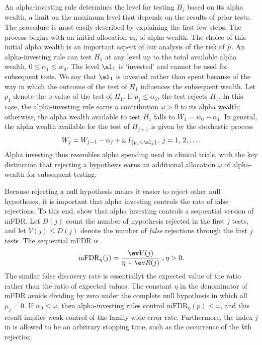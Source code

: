 \documentclass[12pt]{article}
\begin{document}
 An alpha-investing rule \citep{fosterstine08} determines the level for testing
 $H_j$ based on its alpha wealth, a limit on the maximum level that depends on
 the results of prior tests.  The procedure is most easily described by
 explaining the first few steps.  The process begins with an initial allocation
 $w_0$  of alpha wealth.  The choice of this initial alpha
 wealth is an important aspect of our analysis of the risk of $\hat\mu$.  An
 alpha-investing rule can test $H_1$ at any level up to the total available
 alpha wealth, $0 \le \alpha_1 \le w_0$.  The level $\al_1$ is `invested' and
 cannot be used for subsequent tests.  We say that $\al_1$ is invested rather
 than spent because of the way in which the outcome of the test of $H_1$
 influences the subsequent wealth.  Let $p_1$ denote the p-value of the test of
 $H_1$.  If $p_1 \le \alpha_1$, the test rejects $H_1$.  In this case, the
 alpha-investing rule earns a contribution $\omega > 0$ \marginpar{$\omega$} to
 its alpha wealth; otherwise, the alpha wealth available to test $H_1$ falls to
 $W_1 = w_0 - \alpha_1$.  In general, the alpha wealth available for the test of
 $H_{j+1}$ is given by the stochastic process 
 \begin{equation}
    W_j = W_{j-1} - \alpha_j + \omega \, I_{\{p_j < \al_j\}}, \; j = 1,\,2,\ldots.
 \label{eq:Wj}
 \end{equation}
 Alpha investing thus resembles alpha spending used in clinical trials, with the
 key distinction that rejecting a hypothesis earns an additional allocation
 $\omega$ of alpha-wealth for subsequent testing.  


 Because rejecting a null hypothesis makes it easier to reject other null
 hypotheses, it is important that alpha investing controls the rate of false
 rejections.  To this end, \citet{fosterstine08} show that alpha investing
 controls a sequential version of mFDR.  Let $D(j)$ count the number of
 hypothesis rejected in the first $j$ tests, and let $V(j) \le D(j)$ denote the
 number of {\em false} rejections through the first $j$ tests.  The sequential mFDR is
 \begin{equation}
    \mbox{mFDR}_\eta(j) = \frac{\ev V(j)}{\eta + \ev R(j)} \;, \eta > 0.
 \label{eq:mFDR}
 \end{equation}
 The similar false discovery rate is essentiallyt the expected value of the
 ratio rather than the ratio of expected values.  The constant $\eta$ in the
 denominator of mFDR avoids dividing by zero under the complete null hypothesis
 in which all $\mu_j = 0$.  If $w_0 \le \omega$, then alpha-investing rules
 control $\mbox{mFDR}_\eta(p) \le \omega$, and this result implies weak control
 of the family wide error rate.  Furthermore, the index $j$ in  is
 allowed to be an arbitrary stopping time, such as the occurrence of the $k$th
 rejection.
\end{document}
